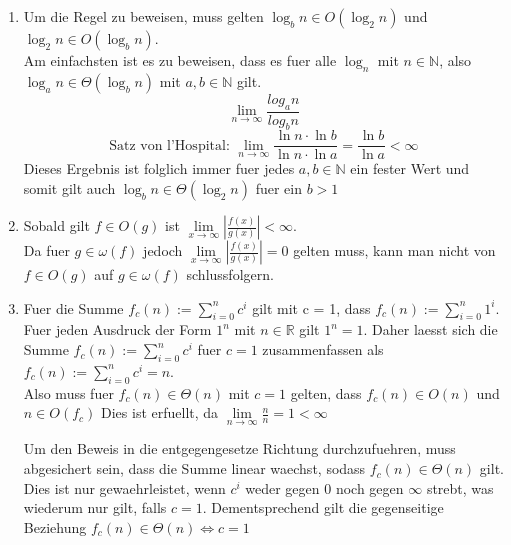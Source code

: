 \documentclass{article}
\begin{document}
\begin{enumerate}
\begin{enumerate}
                \begin{enumerate}
                    \item
                        Um die Regel zu beweisen, muss gelten $\log_b{n} \in O(\log_2{n})$ und $\log_2{n} \in O(\log_b{n})$.\\
                        Am einfachsten ist es zu beweisen, dass es fuer alle $\log_n$ mit $n \in \mathbb{N}$, also $\log_a{n} \in \Theta (\log_b{n})$ mit $a, b \in \mathbb{N}$ gilt. 
                        \[ \lim\limits_{n \rightarrow \infty}{\frac{log_a{n}}{log_b{n}}}\]
                        \[\text{Satz von l'Hospital: } \lim\limits_{n \rightarrow \infty}{\frac{\ln{n}\cdot \ln{b}}{\ln{n}\cdot \ln{a}}}
                         = \frac{\ln{b}}{\ln{a}} < \infty \]
                         Dieses Ergebnis ist folglich immer fuer jedes $a,b \in \mathbb{N}$ ein fester Wert und somit gilt auch $\log_b{n} \in \Theta (\log_2{n})$ fuer ein $b >1$
                    \item
                        Sobald gilt $f \in O(g)$ ist $\lim\limits_{x \rightarrow \infty}{|\frac{f(x)}{g(x)}|} < \infty$.\\
                        Da fuer $g \in \omega(f)$ jedoch $\lim\limits_{x \rightarrow \infty}{|\frac{f(x)}{g(x)}|} = 0$ gelten muss, 
                        kann man nicht von $f \in O(g)$ auf $g \in \omega(f)$ schlussfolgern. 

                    \item
                        Fuer die Summe $f_c(n) := \sum_{i=0}^n c^i $ gilt mit c = 1, dass $f_c(n) := \sum_{i=0}^n 1^i $.\\
                        Fuer jeden Ausdruck der Form $1^n$ mit $n \in \mathbb{R}$ gilt $1^n = 1$. Daher laesst sich die Summe 
                        $f_c(n) := \sum_{i=0}^n c^i $ fuer $c=1$ zusammenfassen als $f_c(n) := \sum_{i=0}^n c^i = n$.\\
                        Also muss fuer $f_c(n) \in \Theta(n)$ mit $c=1$ gelten, dass $f_c(n) \in O(n)$ und $n \in O(f_c)$
                        Dies ist erfuellt, da $\lim\limits_{n \rightarrow \infty}{\frac{n}{n}} = 1 < \infty $
            
                        Um den Beweis in die entgegengesetze Richtung durchzufuehren, muss abgesichert sein, dass die Summe linear waechst, sodass $f_c(n) \in \Theta(n)$ gilt.
                        Dies ist nur gewaehrleistet, wenn $c^i$ weder gegen 0 noch gegen $\infty$ strebt, was wiederum nur gilt, falls $c=1$. Dementsprechend gilt die gegenseitige Beziehung $f_c(n) \in \Theta(n) \Leftrightarrow c=1$
                \end{enumerate}
        \end{enumerate}
    

\end{enumerate}
\end{document}
